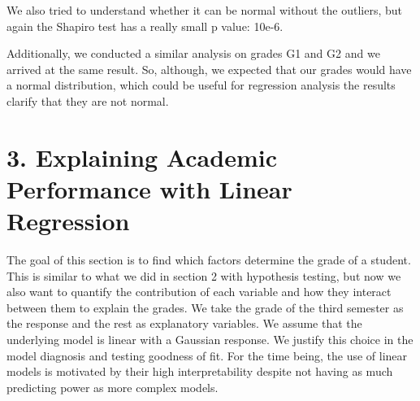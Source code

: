 \documentclass[a4paper, 11pt]{report}
\theoremstyle{definition}
\numberwithin{equation}{section}		%
\numberwithin{table}{section}				%
\begin{document}
We also tried to understand whether it can be normal without the outliers, but again the Shapiro test has a really small p value: 10e-6.

Additionally, we conducted a similar analysis on grades G1 and G2 and we arrived at the same result. So, although, we expected that our grades would
have a normal distribution, which could be useful for regression analysis
the results clarify that they are not normal.

\newpage
\section*{3. Explaining Academic Performance with Linear Regression}
The goal of this section is to find which factors determine the grade of a student. This is similar to what we did in section 2 with hypothesis testing, but now we also want to quantify the contribution of each variable and how they interact between them to explain the grades. We take the grade of the third semester as the response and the rest as explanatory variables. We assume that the underlying model is linear with a Gaussian response. We justify this choice in the model diagnosis and testing goodness of fit. For the time being, the use of linear models is motivated by their high interpretability despite not having as much predicting power as more complex models. \bigskip
\end{document}
